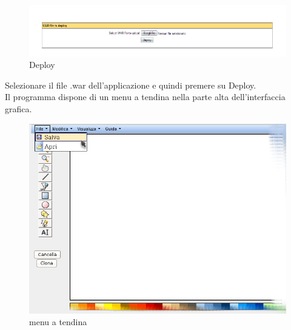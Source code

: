\begin{figure}[!ht]
\centering
\includegraphics[scale=0.7]{images/DeployTomcat.png}
\caption{Deploy}
\end{figure} 

Selezionare il file .war dell'applicazione e quindi premere su Deploy.\\
\newpage
{}
Il programma dispone di un menu a tendina nella parte alta dell'interfaccia grafica.

\begin{figure}[!ht]
\centering
\includegraphics[scale=0.5]{images/menu.png}
\caption{menu a tendina}
\end{figure} 

